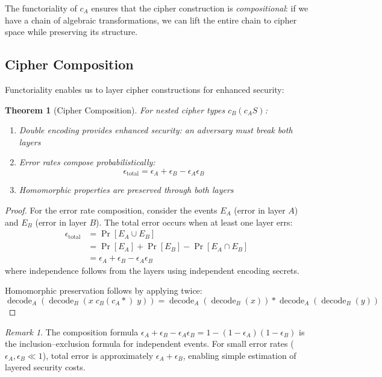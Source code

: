 \documentclass[11pt]{article}
\theoremstyle{definition}
\theoremstyle{plain}
\newtheorem{theorem}{Theorem}[section]
\theoremstyle{remark}
\newtheorem{remark}{Remark}[section]
\newcommand{\cipher}[1]{c_{#1}}
\newcommand{\decode}{\operatorname{decode}}
\begin{document}
The functoriality of $\cipher{A}$ ensures that the cipher construction is \emph{compositional}: if we have a chain of algebraic transformations, we can lift the entire chain to cipher space while preserving its structure.

\subsection{Cipher Composition}

Functoriality enables us to layer cipher constructions for enhanced security:

\begin{theorem}[Cipher Composition]
\label{thm:cipher-composition}
For nested cipher types $\cipher{B}(\cipher{A}S)$:
\begin{enumerate}
\item Double encoding provides enhanced security: an adversary must break both layers
\item Error rates compose probabilistically:
$$\epsilon_{\text{total}} = \epsilon_A + \epsilon_B - \epsilon_A \epsilon_B$$
\item Homomorphic properties are preserved through both layers
\end{enumerate}
\end{theorem}

\begin{proof}
For the error rate composition, consider the events $E_A$ (error in layer $A$) and $E_B$ (error in layer $B$). The total error occurs when at least one layer errs:
\begin{align*}
\epsilon_{\text{total}} &= \Pr[E_A \cup E_B]\\
&= \Pr[E_A] + \Pr[E_B] - \Pr[E_A \cap E_B]\\
&= \epsilon_A + \epsilon_B - \epsilon_A \epsilon_B
\end{align*}
where independence follows from the layers using independent encoding secrets.

Homomorphic preservation follows by applying  twice:
$$\decode_A(\decode_B(x \;\cipher{B}(\cipher{A}*)\; y)) = \decode_A(\decode_B(x)) * \decode_A(\decode_B(y))$$
\end{proof}

\begin{remark}
The composition formula $\epsilon_A + \epsilon_B - \epsilon_A\epsilon_B = 1 - (1-\epsilon_A)(1-\epsilon_B)$ is the inclusion--exclusion formula for independent events. For small error rates ($\epsilon_A, \epsilon_B \ll 1$), total error is approximately $\epsilon_A + \epsilon_B$, enabling simple estimation of layered security costs.
\end{remark}
\end{document}
